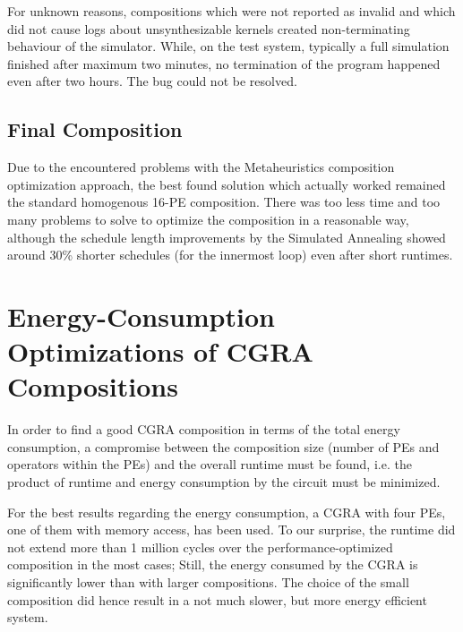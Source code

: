 For unknown reasons, compositions which were not reported as invalid and which did not cause logs about unsynthesizable kernels created non-terminating behaviour of the simulator. While, on the test system, typically a full simulation finished after maximum two minutes, no termination of the program happened even after two hours. The bug could not be resolved.

\subsection{Final Composition}
\label{subsec:finalCompositionPerformance}
Due to the encountered problems with the Metaheuristics composition optimization approach, the best found solution which actually worked remained the standard homogenous 16-PE composition. There was too less time and too many problems to solve to optimize the composition in a reasonable way, although the schedule length improvements by the Simulated Annealing showed around 30\% shorter schedules (for the innermost loop) even after short runtimes.


\section{Energy-Consumption Optimizations of CGRA Compositions}
\label{sec:energyComposition}

In order to find a good CGRA composition in terms of the total energy consumption, a compromise between the composition size (number of PEs and operators within the PEs) and the overall runtime must be found, i.e. the product of runtime and energy consumption by the circuit must be minimized.

For the best results regarding the energy consumption, a CGRA with four PEs, one of them with memory access, has been used. To our surprise, the runtime did not extend more than 1 million cycles over the performance-optimized composition in the most cases; Still, the energy consumed by the CGRA is significantly lower than with larger compositions. The choice of the small composition did hence result in a not much slower, but more energy efficient system.


